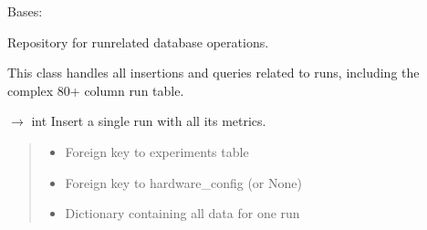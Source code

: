\documentclass[letterpaper,10pt,english]{sphinxmanual}
\begin{document}
\begin{fulllineitems}
\label{\detokenize{core.database.repositories.runs:core.database.repositories.runs.RunsRepository}}
\pysigstartsignatures
\pysiglinewithargsret
{}
{}
{}
\pysigstopsignatures
\sphinxAtStartPar
Bases: 

\sphinxAtStartPar
Repository for run\sphinxhyphen{}related database operations.

\sphinxAtStartPar
This class handles all insertions and queries related to runs,
including the complex 80+ column run table.

\begin{fulllineitems}
\label{\detokenize{core.database.repositories.runs:core.database.repositories.runs.RunsRepository.insert_run}}
\pysigstartsignatures
\pysiglinewithargsret
{}
{\sphinxparamcomma {}\sphinxparamcomma {}}
{{ $\rightarrow$ int}}
\pysigstopsignatures
\sphinxAtStartPar
Insert a single run with all its metrics.
\begin{quote}\begin{description}
\begin{itemize}
\item {} 
\sphinxAtStartPar
{} \textendash{} Foreign key to experiments table

\item {} 
\sphinxAtStartPar
{} \textendash{} Foreign key to hardware\_config (or None)

\item {} 
\sphinxAtStartPar
{} \textendash{} Dictionary containing all data for one run


\end{itemize}
\end{description}
\end{quote}
\end{fulllineitems}
\end{fulllineitems}
\end{document}
